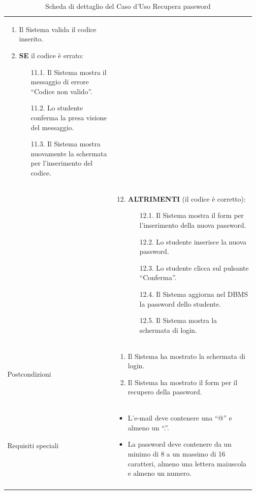\documentclass[12pt,a4paper]{article}
\begin{document}
\begin{longtable}{|
>{\columncolor{unipablue}\color{white}\bfseries\raggedright\arraybackslash}p{3.4cm}|
>{\raggedright\arraybackslash}p{11.1cm}|}
\begin{enumerate}
    \item Il Sistema valida il codice inserito.
    \item \textbf{SE} il codice è errato:
    \begin{itemize}
        \item[11.1.] Il Sistema mostra il messaggio di errore ``Codice non valido''.
        \item[11.2.] Lo studente conferma la presa visione del messaggio.
        \item[11.3.] Il Sistema mostra nuovamente la schermata per l'inserimento del codice.
    \end{itemize}
\end{enumerate} \\
&
\begin{enumerate}
    \setcounter{enumi}{11}
    \item \textbf{ALTRIMENTI} (il codice è corretto):
    \begin{itemize}
        \item[12.1.] Il Sistema mostra il form per l'inserimento della nuova password.
        \item[12.2.] Lo studente inserisce la nuova password.
        \item[12.3.] Lo studente clicca sul pulsante ``Conferma''.
        \item[12.4.] Il Sistema aggiorna nel DBMS la password dello studente.
        \item[12.5.] Il Sistema mostra la schermata di login.
    \end{itemize}
\end{enumerate} \\ \hline
Postcondizioni &
\begin{enumerate}
    \item Il Sistema ha mostrato la schermata di login.
    \item Il Sistema ha mostrato il form per il recupero della password.
\end{enumerate} \\ \hline
Requisiti speciali &
\begin{itemize}
    \item L'e-mail deve contenere una ``@'' e almeno un ``.''.
    \item La password deve contenere da un minimo di 8 a un massimo di 16 caratteri, almeno una lettera maiuscola e almeno un numero.
\end{itemize} \\ \hline
\caption{Scheda di dettaglio del Caso d'Uso Recupera password}
\label{tab:uc_recupera_password}\\
\end{longtable}
\normalsize
\end{document}
